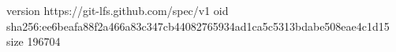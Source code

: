version https://git-lfs.github.com/spec/v1
oid sha256:ee6beafa88f2a466a83c347cb44082765934ad1ca5c5313bdabe508eae4c1d15
size 196704
